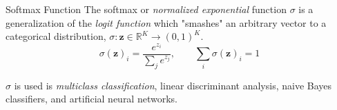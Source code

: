 \documentclass{cognito}
\begin{document}

\begin{note}{Softmax Function}
	The softmax or {\it normalized exponential} function $\sigma$ is a generalization of the {\it logit function}
	which "smashes" an arbitrary vector to a categorical distribution, $\sigma : \bm z \in \mathbb{R}^K \to (0, 1)^K$.
	$$
		\sigma(\bm z)_i = \frac{e^{z_i}}{\sum_j e^{z_j}}, \quad \quad \sum_i \sigma(\bm z)_i = 1
	$$
	\begin{remark} $\sigma$ is used is {\it multiclass classification},  linear discriminant analysis, naive Bayes classifiers, and artificial neural networks.
	\end{remark}
	\vspace{-5pt}
\end{note}





\end{document}

